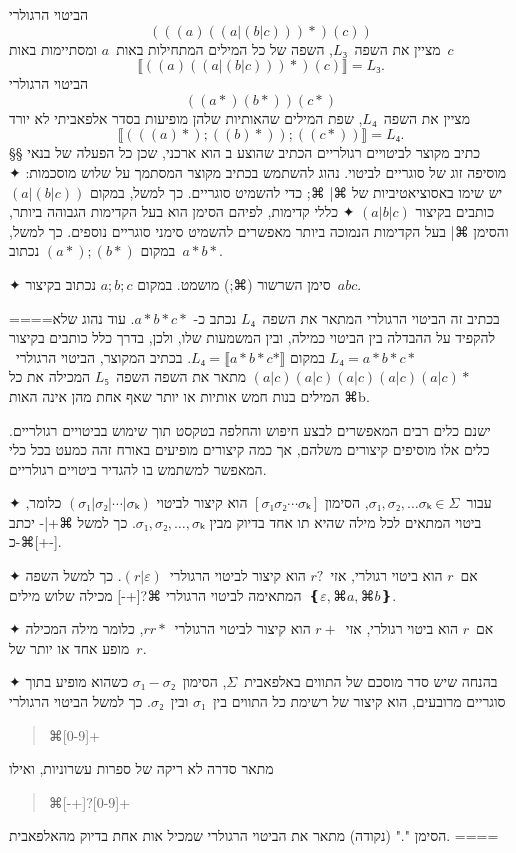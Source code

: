 הביטוי הרגולרי \[
  (((a)((a|(b|c)))*)(c))
\] מציין את השפה~$L₃$, השפה של כל המילים המתחילות באות~$a$ ומסתיימות באות~$c$ \[
  ⟦((a)((a|(b|c)))*)(c)⟧=L₃.
\] הביטוי הרגולרי \[
  ((a*)(b*))(c*)
\] מציין את השפה~$L₄$, שפת המילים שהאותיות שלהן מופיעות בסדר אלפאביתי לא יורד \[
  ⟦ (((a)*);((b)*));((c*))⟧=L₄.
\] §§ כתיב מקוצר לביטויים רגולריים
הכתיב שהוצע ב הוא ארכני, שכן כל הפעלה של בנאי מוסיפה זוג של
סוגריים לביטוי. נהוג להשתמש בכתיב מקוצר המסתמך על שלוש מוסכמות:
✦ יש שימו באסוציאטיביות של ⌘| ⌘; כדי להשמיט סוגריים. כך למשל, במקום
$(a|(b|c))$
כותבים בקיצור
$(a|b|c)$
✦ כללי קדימות, לפיהם הסימן \* הוא בעל הקדימות הגבוהה ביותר, והסימן ⌘| בעל
הקדימות הנמוכה ביותר מאפשרים להשמיט סימני סוגריים נוספים. כך למשל, במקום
$(a*);(b*)$
נכתוב~$a*b*$.

✦ סימן השרשור (⌘;) מושמט. במקום
$a;b;c$
נכתוב בקיצור~$abc$.

====בכתיב זה הביטוי הרגולרי המתאר את השפה~$L₄$ נכתב כ-
$a*b*c*$.
עוד נהוג שלא להקפיד על ההבדלה בין הביטוי כמילה, ובין המשמעות שלו, ולכן, בדרך כלל כותבים בקיצור
$L₄=a*b*c*$
במקום
$L₄=⟦a*b*c*⟧$.
בכתיב המקוצר, הביטוי הרגולרי~$(a|c)(a|c)(a|c)(a|c)(a|c)*$ מתאר את השפה
השפה~$L₅$ המכילה את כל המילים בנות חמש אותיות או יותר שאף אחת מהן אינה האות ⌘b.

ישנם כלים רבים המאפשרים לבצע חיפוש והחלפה בטקסט תוך שימוש בביטויים רגולריים.
כלים אלו מוסיפים קיצורים משלהם, אך כמה קיצורים מופיעים באורח זהה כמעט בכל כלי
המאפשר למשתמש בו להגדיר ביטויים רגולריים.

✦ עבור~$σ₁,σ₂,…σₖ∈Σ$, הסימון
$[σ₁σ₂⋯σₖ]$
הוא קיצור לביטוי
$(σ₁|σ₂|⋯|σₖ)$
כלומר, ביטוי המתאים לכל מילה שהיא תו אחד בדיוק מבין
$σ₁,σ₂,…,σₖ$.
כך למשל ⌘{+|-}
יכתב כ-⌘{[+-]}.

✦ אם~$r$ הוא ביטוי רגולרי, אזי~$r?$ הוא קיצור לביטוי הרגולרי~$(r|ε)$. כך למשל
השפה המתאימה לביטוי הרגולרי ⌘{?[+-]} מכילה שלוש מילים~$❴ε, ⌘a, ⌘b❵$.

✦ אם~$r$ הוא ביטוי רגולרי, אזי~$r+$ הוא קיצור לביטוי הרגולרי~$rr*$, כלומר מילה
המכילה מופע אחד או יותר של~$r$.

✦ בהנחה שיש סדר מוסכם של התווים באלפאבית~$Σ$, הסימון~$σ₁-σ₂$ כשהוא מופיע בתוך
סוגריים מרובעים, הוא קיצור של רשימת כל התווים בין~$σ₁$ ובין~$σ₂$.
כך למשל הביטוי הרגולרי
\begin{quote}
  ⌘{[0-9]+}
\end{quote}
מתאר סדרה לא ריקה של ספרות עשרוניות, ואילו
\begin{quote}
  ⌘{[-+]?[0-9]+}
\end{quote}
הסימן "." (נקודה) מתאר את הביטוי הרגולרי שמכיל אות אחת בדיוק מהאלפאבית.
====

